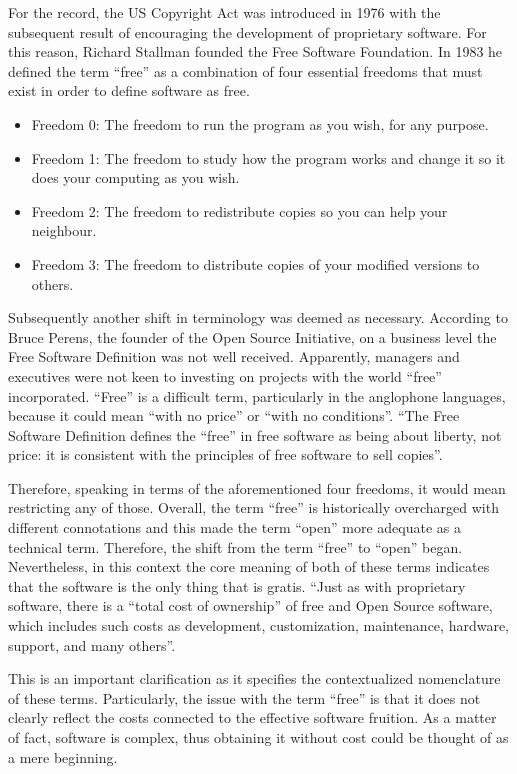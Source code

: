 For the record, the US Copyright Act was introduced in 1976 with the subsequent result of encouraging the development of proprietary software.
For this reason, Richard Stallman founded the Free Software Foundation. In 1983 he defined the term “free” as a combination of four essential freedoms that must exist in order to define software as free.

\begin{itemize}
\item Freedom 0: The freedom to run the program as you wish, for any purpose.
\item Freedom 1: The freedom to study how the program works and change it so it does your computing as you wish.
\item Freedom 2: The freedom to redistribute copies so you can help your neighbour.
\item Freedom 3: The freedom to distribute copies of your modified versions to others.
\end{itemize}

Subsequently another shift in terminology was deemed as necessary. According to Bruce Perens, the founder of the Open Source Initiative, on a business level the Free Software Definition was not well received. Apparently, managers and executives were not keen to investing on projects with the world “free” incorporated.
“Free” is a difficult term, particularly in the anglophone languages, because it could mean “with no price” or “with no conditions”.
“The Free Software Definition defines the “free” in free software as being about liberty, not price: it is consistent with the principles of free software to sell copies”.

Therefore, speaking in terms of the aforementioned four freedoms, it would mean restricting any of those. Overall, the term “free” is historically overcharged with different connotations and this made the term “open” more adequate as a technical term. Therefore, the shift from the term “free” to “open” began. Nevertheless, in this context the core meaning of both of these terms indicates that the software is the only thing that is gratis. “Just as with proprietary software, there is a “total cost of ownership” of free and Open Source software, which includes such costs as development, customization, maintenance, hardware, support, and many others”.

This is an important clarification as it specifies the contextualized nomenclature of these terms. Particularly, the issue with the term “free” is that it does not clearly reflect the costs connected to the effective software fruition. As a matter of fact, software is complex, thus obtaining it without cost could be thought of as a mere beginning.

